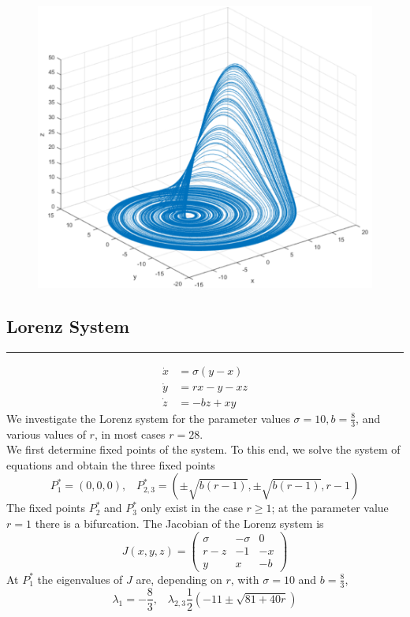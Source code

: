 \begin{figure}[H]
  \centering
  \includegraphics[width=.7\linewidth]{Pics/4.47.png}
\end{figure}

\subsection{Lorenz System}
\noindent\rule[\linienAbstand]{\linewidth}{\linienDicke}
\begin{equation}
  \begin{split}
    \dot{x} &= \sigma(y-x)\\
    \dot{y} &= rx - y - xz\\
    \dot{z} &=-bz + xy
  \end{split}
\end{equation}
We investigate the Lorenz system for the parameter values $\sigma = 10, b = \frac{8}{3}$, and various values of $r$, in most cases $r = 28$.\\
We first determine fixed points of the system. To this end, we solve the system of equations and obtain the three fixed points
\begin{equation}
  P_1^* = (0, 0, 0),\;\;\; P_{2,3}^* = \left(\pm \sqrt{b(r-1)}, \pm \sqrt{b(r-1)}, r-1\right)
\end{equation}
The fixed points $P_2^*$ and $P_3^*$ only exist in the case $r \geq 1$; at the parameter value $r = 1$ there is a bifurcation. The Jacobian of the Lorenz system is
\begin{equation}
  J(x, y, z) =
  \begin{pmatrix}
    \sigma & -\sigma & 0 \\
    r-z & -1 & -x \\
    y & x & -b
  \end{pmatrix}
\end{equation}
At $P_1^*$ the eigenvalues of $J$ are, depending on $r$, with $\sigma = 10$ and $b = \frac{8}{3}$,
\begin{equation}
  \lambda_1 = -\frac{8}{3}, \;\;\; \lambda_{2,3} \frac{1}{2}\left(-11 \pm \sqrt{81 + 40r}\right)
\end{equation}

